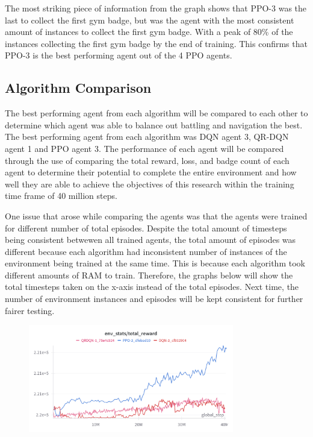The most striking piece of information from the graph shows that PPO-3 was the last to collect the first gym badge, but was the agent with the most consistent amount of instances to collect the first gym badge. With a peak of 80\% of the instances collecting the first gym badge by the end of training. This confirms that PPO-3 is the best performing agent out of the 4 PPO agents.

\subsection{Algorithm Comparison}

The best performing agent from each algorithm will be compared to each other to determine which agent was able to balance out battling and navigation the best. The best performing agent from each algorithm was DQN agent 3, QR-DQN agent 1 and PPO agent 3. The performance of each agent will be compared through the use of comparing the total reward, loss, and badge count of each agent to determine their potential to complete the entire environment and how well they are able to achieve the objectives of this research within the training time frame of 40 million steps. 

One issue that arose while comparing the agents was that the agents were trained for different number of total episodes. Despite the total amount of timesteps being consistent betwewen all trained agents, the total amount of episodes was different because each algorithm had inconsistent number of instances of the environment being trained at the same time. This is because each algorithm took different amounts of RAM to train. Therefore, the graphs below will show the total timesteps taken on the x-axis instead of the total episodes. Next time, the number of environment instances and episodes will be kept consistent for further fairer testing. 

\begin{figure}[H]
    \centering
    \includegraphics[width=0.8\textwidth]{figures/all_step_total_reward.png}
    \caption{}
    \label{fig:agent_eval_all_reward}
\end{figure}

